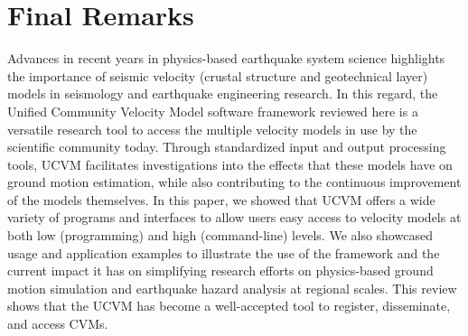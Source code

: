 
\section{Final Remarks}

Advances in recent years in physics-based earthquake system science highlights the importance of seismic velocity (crustal structure and geotechnical layer) models in seismology and earthquake engineering research. In this regard, the Unified Community Velocity Model software framework reviewed here is a versatile research tool to access the multiple velocity models in use by the scientific community today. Through standardized input and output processing tools, UCVM facilitates investigations into the effects that these models have on ground motion estimation, while also contributing to the continuous improvement of the models themselves. In this paper, we showed that UCVM offers a wide variety of programs and interfaces to allow users easy access to velocity models at both low (programming) and high (command-line) levels. We also showcased usage and application examples to illustrate the use of the framework and the current impact it has on simplifying research efforts on physics-based ground motion simulation and earthquake hazard analysis at regional scales. This review shows that the UCVM has become a well-accepted tool to register, disseminate, and access CVMs.


